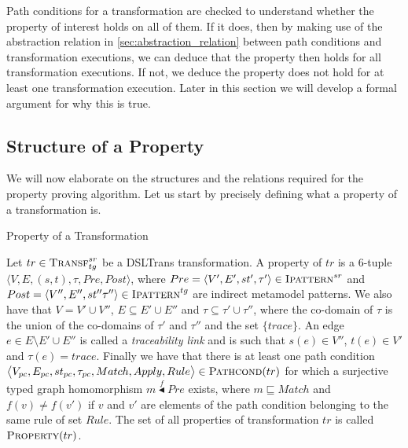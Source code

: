 Path conditions for a transformation are checked to understand whether the property of interest holds on all of them. If it does, then by making use of the abstraction relation in \cref{sec:abstraction_relation} between path conditions and transformation executions, we can deduce that the property then holds for all transformation executions. If not, we deduce the property does not hold for at least one transformation execution. Later in this section we will develop a formal argument for why this is true.

\subsection{Structure of a Property}
We will now elaborate on the structures and the relations required for the property proving algorithm. Let us start by precisely defining what a property of a transformation is. 


\begin{definition}{Property of a Transformation\\}
\label{def:trans_prop}

    
Let $tr\in \textsc{Transf}^{sr}_{tg}$ be a DSLTrans transformation. A property of $tr$ is a 6-tuple $\langle V,E,(s,t),\tau,Pre,Post\rangle$, where $Pre = \langle V',E',st',\tau'\rangle \in \textsc{Ipattern}^{sr}$ and $Post = \langle V'',E'',st''\tau''\rangle \in\\ \textsc{Ipattern}^{tg}$ are indirect metamodel patterns. We also have that $V=V'\cup V''$, $E\subseteq E'\cup E''$ and $\tau\subseteq \tau'\cup \tau''$, where the co-domain of $\tau$ is the union of the co-domains of $\tau'$ and $\tau''$ and the set $\{trace\}$. An edge $e \in E\setminus E'\cup E''$ is called a \emph{traceability link} and is such that $s(e)\in V''$, $t(e)\in V'$ and $\tau(e)=trace$. Finally we have that there is at least one path condition $\big\langle V_{pc},E_{pc},st_{pc},\tau_{pc}, Match,Apply,Rule\big\rangle\in \textsc{Pathcond}(tr)$ for which a surjective typed graph homomorphism $m\stackrel{f}{\blacktriangleleft} Pre$ exists, where $m\sqsubseteq Match$ and $f(v)\neq f(v')$ if $v$ and $v'$ are elements of the path condition belonging to the same rule of set $Rule$. The set of all properties of transformation $tr$ is called $\textsc{Property}(tr)$.

\end{definition}

